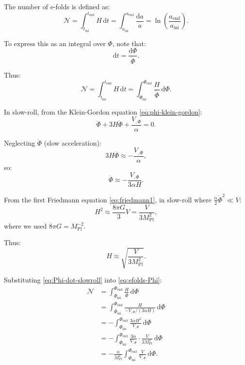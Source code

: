\documentclass[11pt,a4paper]{article}
\numberwithin{equation}{section}
\theoremstyle{plain}
\theoremstyle{definition}
\theoremstyle{remark}
\newcommand{\dd}{\mathrm{d}}
\begin{document}
The number of e-folds is defined as:
\begin{equation}
\mathcal{N} = \int_{t_{\mathrm{ini}}}^{t_{\mathrm{end}}} H\,\dd t = \int_{a_{\mathrm{ini}}}^{a_{\mathrm{end}}} \frac{\dd a}{a} = \ln\left(\frac{a_{\mathrm{end}}}{a_{\mathrm{ini}}}\right).
\label{eq:efolds-def}
\end{equation}

To express this as an integral over $\Phi$, note that:
\begin{equation}
\dd t = \frac{\dd\Phi}{\dot{\Phi}}.
\end{equation}

Thus:
\begin{equation}
\mathcal{N} = \int_{t_{\mathrm{ini}}}^{t_{\mathrm{end}}} H\,\dd t = \int_{\Phi_{\mathrm{ini}}}^{\Phi_{\mathrm{end}}} \frac{H}{\dot{\Phi}}\,\dd\Phi.
\label{eq:efolds-Phi}
\end{equation}

In slow-roll, from the Klein-Gordon equation \eqref{eq:phi-klein-gordon}:
\begin{equation}
\ddot{\Phi} + 3H\dot{\Phi} + \frac{V_{,\Phi}}{\alpha} = 0.
\end{equation}

Neglecting $\ddot{\Phi}$ (slow acceleration):
\begin{equation}
3H\dot{\Phi} \approx -\frac{V_{,\Phi}}{\alpha},
\end{equation}
so:
\begin{equation}
\dot{\Phi} \approx -\frac{V_{,\Phi}}{3\alpha H}.
\label{eq:Phi-dot-slowroll}
\end{equation}

From the first Friedmann equation \eqref{eq:friedmann1}, in slow-roll where $\frac{\alpha}{2}\dot{\Phi}^2 \ll V$:
\begin{equation}
H^2 \approx \frac{8\pi G}{3}V = \frac{V}{3M_{\mathrm{Pl}}^2},
\end{equation}
where we used $8\pi G = M_{\mathrm{Pl}}^{-2}$.

Thus:
\begin{equation}
H \approx \sqrt{\frac{V}{3M_{\mathrm{Pl}}^2}}.
\label{eq:H-slowroll}
\end{equation}

Substituting \eqref{eq:Phi-dot-slowroll} into \eqref{eq:efolds-Phi}:
\begin{align}
\mathcal{N} &= \int_{\Phi_{\mathrm{ini}}}^{\Phi_{\mathrm{end}}} \frac{H}{\dot{\Phi}}\,\dd\Phi\\
&= \int_{\Phi_{\mathrm{ini}}}^{\Phi_{\mathrm{end}}} \frac{H}{-V_{,\Phi}/(3\alpha H)}\,\dd\Phi\\
&= -\int_{\Phi_{\mathrm{ini}}}^{\Phi_{\mathrm{end}}} \frac{3\alpha H^2}{V_{,\Phi}}\,\dd\Phi\\
&= -\int_{\Phi_{\mathrm{ini}}}^{\Phi_{\mathrm{end}}} \frac{3\alpha}{V_{,\Phi}}\cdot\frac{V}{3M_{\mathrm{Pl}}^2}\,\dd\Phi\\
&= -\frac{\alpha}{M_{\mathrm{Pl}}^2}\int_{\Phi_{\mathrm{ini}}}^{\Phi_{\mathrm{end}}} \frac{V}{V_{,\Phi}}\,\dd\Phi.
\end{align}
\end{document}
